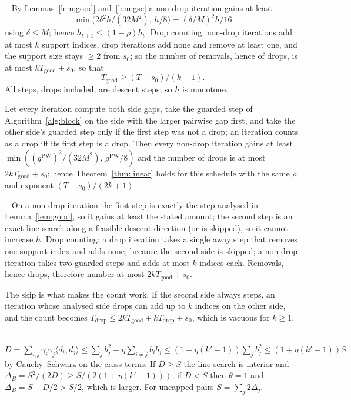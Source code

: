 \documentclass{opt2026}   %
\renewenvironment{proof}[1][]{\par\noindent{\bfseries\upshape Proof#1.}\ }{\jmlrQED}
\newcommand{\ip}[2]{\langle #1, #2 \rangle}
\newcommand{\gPW}{g^{\mathrm{PW}}}
\begin{document}
\begin{proof}[ of Theorem~\ref{thm:linear}]
By Lemmas~\ref{lem:good} and~\ref{lem:gsc} a non-drop iteration gains
at least
\[\min\big(2\delta^2h/(32M^2),\,h/8\big)=(\delta/M)^2h/16\]
using $\delta\le M$; hence $h_{t+1}\le(1-\rho)h_t$. Drop counting:
non-drop
iterations add at most $k$ support indices, drop iterations add none
and remove at least one, and the support size stays $\ge2$ from $s_0$;
so the number of removals, hence of drops, is at most
$kT_{\mathrm{good}}+s_0$, so that
\[T_{\mathrm{good}}\ge(T-s_0)/(k+1).\]
All steps, drops included, are descent steps, so $h$ is monotone.
\end{proof}

\begin{lemma}\label{lem:twosided}
Let every iteration compute both side gaps, take the guarded step of
Algorithm~\ref{alg:block} on the side with the larger pairwise gap
first, and take the other side's guarded step only if the first step
was not a drop; an iteration counts as a drop iff its first step is a
drop. Then every non-drop iteration gains at least
$\min((\gPW)^2/(32M^2),\,\gPW/8)$ and
the number of drops is at most $2kT_{\mathrm{good}}+s_0$; hence
Theorem~\ref{thm:linear} holds for this schedule with the same $\rho$
and exponent $(T-s_0)/(2k+1)$.
\end{lemma}
\begin{proof}
On a non-drop iteration the first step is exactly the step analysed in
Lemma~\ref{lem:good}, so it gains at least the stated amount; the
second step is an exact line search along a feasible descent direction
(or is skipped), so it cannot increase $h$. Drop counting: a drop
iteration takes a single away step that removes one support index and
adds none, because the second side is skipped; a non-drop iteration
takes two guarded steps and adds at most $k$ indices each. Removals,
hence drops, therefore number at most $2kT_{\mathrm{good}}+s_0$.
\end{proof}
\begin{remark}
The skip is what makes the count work. If the second side always
steps, an iteration whose analysed side drops can add up to $k$ indices
on the other side, and the count becomes
$T_{\mathrm{drop}}\le2kT_{\mathrm{good}}+kT_{\mathrm{drop}}+s_0$, which is
vacuous for $k\ge1$.
\end{remark}

\begin{proof}[ of Proposition~\ref{prop:orth}]
$D=\sum_{i,j}\gamma_i\gamma_j\ip{d_i}{d_j}\le\sum_jb_j^2+\eta\sum_{i\ne j}b_ib_j\le(1+\eta(k'-1))\sum_jb_j^2\le(1+\eta(k'-1))S$
by Cauchy--Schwarz on the cross terms. If $D\ge S$ the line search is
interior and $\Delta_B=S^2/(2D)\ge S/(2(1+\eta(k'-1)))$; if $D<S$ then
$\theta=1$ and $\Delta_B=S-D/2>S/2$, which is larger. For uncapped pairs
$S=\sum_j2\Delta_j$.
\end{proof}
\end{document}
